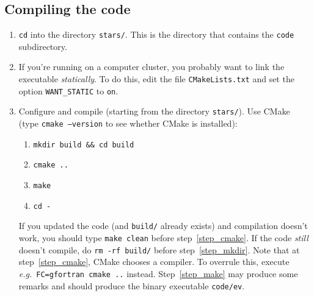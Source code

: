 \subsection{Compiling the code}
\label{sec:compiling}
\begin{enumerate}

\item \texttt{cd} into the directory \texttt{stars/}. This is the directory that contains the \texttt{code} subdirectory.


\item If you're running on a computer cluster, you probably want to link the executable \emph{statically}.  
  To do this, edit the file \texttt{CMakeLists.txt} and set the option \texttt{WANT\_STATIC} to \texttt{on}.

\item Configure and compile (starting from the directory \texttt{stars/}).
    Use CMake (type \texttt{cmake --version} to see whether CMake is installed):
    \begin{enumerate}
    \item \texttt{mkdir build \&\& cd build} \label{step_mkdir}
    \item \texttt{cmake~..} \label{step_cmake}
    \item \texttt{make} \label{step_make}
    \item \texttt{cd -}
    \end{enumerate}
    If you updated the code (and \texttt{build/} already exists) and compilation doesn't 
    work, you should type \texttt{make clean} before step~\ref{step_cmake}.  If the code 
    \emph{still} doesn't compile, do \texttt{rm -rf build/} before step~\ref{step_mkdir}.
    Note that at step~\ref{step_cmake}, CMake chooses a compiler.  To overrule this, execute 
    \emph{e.g.}\ \texttt{FC=gfortran~cmake~..} instead.
    Step~\ref{step_make} may produce some remarks and should produce the binary executable 
    \texttt{code/ev}.


\end{enumerate}
